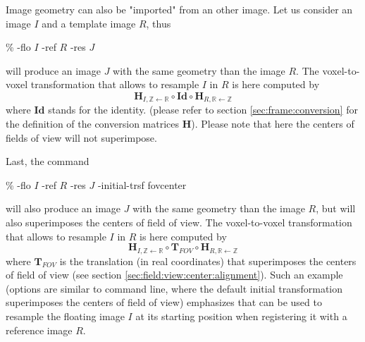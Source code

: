 Image geometry can also be "imported" from an other image. Let us consider an image $I$ and a template image $R$, thus 
\begin{code}{0.8}
\% \applyTrsf -flo $I$ -ref $R$ -res $J$ 
\end{code}
will produce an image $J$ with the same geometry than the image $R$. The voxel-to-voxel transformation that allows to resample $I$ in $R$ is here computed by
\begin{displaymath}
\mathbf{H}_{I,\mathbb{Z} \leftarrow \mathbb{R}} 
\circ \mathbf{Id} \circ \mathbf{H}_{R,\mathbb{R} \leftarrow \mathbb{Z}} 
\end{displaymath}
where $\mathbf{Id}$ stands for the identity.
(please refer to section \ref{sec:frame:conversion} for the definition of the conversion matrices $\mathbf{H}$). Please note that here the centers of fields of view will not superimpose. 

Last, the command 
\begin{code}{0.8}
\% \applyTrsf -flo $I$ -ref $R$ -res $J$ -initial-trsf  fovcenter
\end{code}
will also produce an image $J$ with the same geometry than the image $R$, but will also superimposes the centers of field of view. The voxel-to-voxel transformation that allows to resample $I$ in $R$ is here computed by
\begin{displaymath}
\mathbf{H}_{I,\mathbb{Z} \leftarrow \mathbb{R}} 
\circ \mathbf{T}_{FOV} \circ \mathbf{H}_{R,\mathbb{R} \leftarrow \mathbb{Z}} 
\end{displaymath}
where $\mathbf{T}_{FOV}$ is the translation (in real coordinates) that superimposes the centers of field of view  (see section \ref{sec:field:view:center:alignment}).
Such an example (options are similar to \blockmatching command line, where the default initial transformation superimposes the centers of field of view) emphasizes that \applyTrsf can be used to resample the floating image $I$ at its starting position when registering it with a reference image $R$.

\section{\applyTrsfToPoints}





\section{\buildPyramidImage}
\label{sec:buildPyramidImage}





